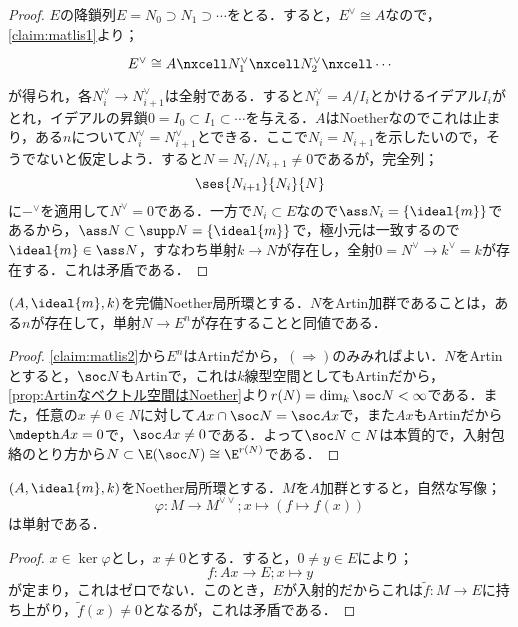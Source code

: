 \begin{proof}
	$E$の降鎖列$E=N_0\supset N_1\supset\cdots$をとる．すると，$E^\vee\cong A$なので，\ref{claim:matlis1}より；
	\[\begin{tikzcd}
		E^\vee\cong A\nxcell N_1^\vee\nxcell N_2^\vee\nxcell\cdots
	\end{tikzcd}\]
	が得られ，各$N_i^\vee\to N_{i+1}^\vee$は全射である．すると$N_i^\vee=A/I_i$とかけるイデアル$I_i$がとれ，イデアルの昇鎖$0=I_0\subset I_1\subset\cdots$を与える．$A$はNoetherなのでこれは止まり，ある$n$について$N_i^\vee= N_{i+1}^\vee$とできる．ここで$N_i=N_{i+1}$を示したいので，そうでないと仮定しよう．すると$N=N_i/N_{i+1}\neq0$であるが，完全列；
	\[\ses{N_{i+1}}{N_i}{N}\]
	に$-^\vee$を適用して$N^\vee=0$である．一方で$N_i\subset E$なので$\ass N_i=\{\ideal{m}\}$であるから，$\ass N\subset\supp N=\{\ideal{m}\}$で，極小元は一致するので$\ideal{m}\in\ass N$，すなわち単射$k\to N$が存在し，全射$0=N^\vee\to k^\vee=k$が存在する．これは矛盾である．
\end{proof}

\begin{prop}\label{claim:matlis3}
	$(A,\ideal{m},k)$を完備Noether局所環とする．$N$をArtin加群であることは，ある$n$が存在して，単射$N\to E^n$が存在することと同値である．
\end{prop}

\begin{proof}
	\ref{claim:matlis2}から$E^n$はArtinだから，$(\Longrightarrow)$のみみればよい．$N$をArtinとすると，$\soc N$もArtinで，これは$k$線型空間としてもArtinだから，\ref{prop:Artinなベクトル空間はNoether}より$r(N)=\dim_k\soc N<\infty$である．また，任意の$x\neq0\in N$に対して$Ax\cap\soc N=\soc Ax$で，また$Ax$もArtinだから$\mdepth Ax=0$で，$\soc Ax\neq0$である．よって$\soc N\subset N$は本質的で，入射包絡のとり方から$N\subset\E(\soc N)\cong \E^{r(N)}$である．
\end{proof}

\begin{prop}\label{claim:matlis4}
	$(A,\ideal{m},k)$をNoether局所環とする．$M$を$A$加群とすると，自然な写像；
	\[\varphi:M\to M^{\vee\vee};x\mapsto(f\mapsto f(x))\]
	は単射である．
\end{prop}

\begin{proof}
	$x\in\ker\varphi$とし，$x\neq 0$とする．すると，$0\neq y\in E$により；
	\[f:Ax\to E;x\mapsto y\]
	が定まり，これはゼロでない．このとき，$E$が入射的だからこれは$\widetilde{f}:M\to E$に持ち上がり，$\widetilde{f}(x)\neq0$となるが，これは矛盾である．
\end{proof}

